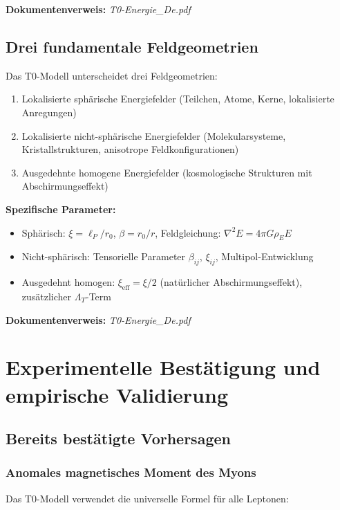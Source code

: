 \documentclass[12pt,a4paper]{article}
\newcommand{\xipar}{\xi}
\begin{document}
	\textbf{Dokumentenverweis:} \textit{T0-Energie\_De.pdf}
	
	\subsection{Drei fundamentale Feldgeometrien}
	
	Das T0-Modell unterscheidet drei Feldgeometrien:
	
	\begin{enumerate}
		\item Lokalisierte sphärische Energiefelder (Teilchen, Atome, Kerne, lokalisierte Anregungen)
		\item Lokalisierte nicht-sphärische Energiefelder (Molekularsysteme, Kristallstrukturen, anisotrope Feldkonfigurationen)
		\item Ausgedehnte homogene Energiefelder (kosmologische Strukturen mit Abschirmungseffekt)
	\end{enumerate}
	
	\textbf{Spezifische Parameter:}
	\begin{itemize}
		\item Sphärisch: $\xipar = \ell_P/r_0$, $\beta = r_0/r$, Feldgleichung: $\nabla^2 E = 4\pi G \rho_E E$
		\item Nicht-sphärisch: Tensorielle Parameter $\beta_{ij}$, $\xipar_{ij}$, Multipol-Entwicklung
		\item Ausgedehnt homogen: $\xipar_{\text{eff}} = \xipar/2$ (natürlicher Abschirmungseffekt), zusätzlicher $\Lambda_T$-Term
	\end{itemize}
	
	\textbf{Dokumentenverweis:} \textit{T0-Energie\_De.pdf}
	
	\section{Experimentelle Bestätigung und empirische Validierung}
	
	\subsection{Bereits bestätigte Vorhersagen}
	
	\subsubsection{Anomales magnetisches Moment des Myons}
	
	Das T0-Modell verwendet die universelle Formel für alle Leptonen:
	
\end{document}
